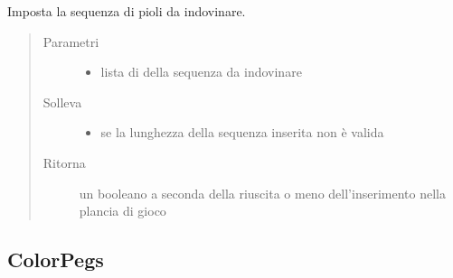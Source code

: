 \documentclass[letterpaper,10pt,italian,openany,oneside]{sphinxmanual}
\begin{document}
\begin{fulllineitems}
\label{\detokenize{source/it/unicam/cs/pa/mastermind/gamecore/BoardModel:it.unicam.cs.pa.mastermind.gamecore.BoardModel.setSequenceToGuess(List)}}
Imposta la sequenza di pioli da indovinare.
\begin{quote}\begin{description}
\item[{Parametri}] \leavevmode\begin{itemize}
\item {} 
 \textendash{} lista di  della sequenza da indovinare

\end{itemize}

\item[{Solleva}] \leavevmode\begin{itemize}
\item {} 
 \textendash{} se la lunghezza della sequenza inserita non è valida

\end{itemize}

\item[{Ritorna}] \leavevmode
un booleano a seconda della riuscita o meno dell’inserimento nella plancia di gioco

\end{description}\end{quote}

\end{fulllineitems}



\subsection{ColorPegs}
\label{\detokenize{source/it/unicam/cs/pa/mastermind/gamecore/ColorPegs:colorpegs}}\label{\detokenize{source/it/unicam/cs/pa/mastermind/gamecore/ColorPegs::doc}}
\end{document}

